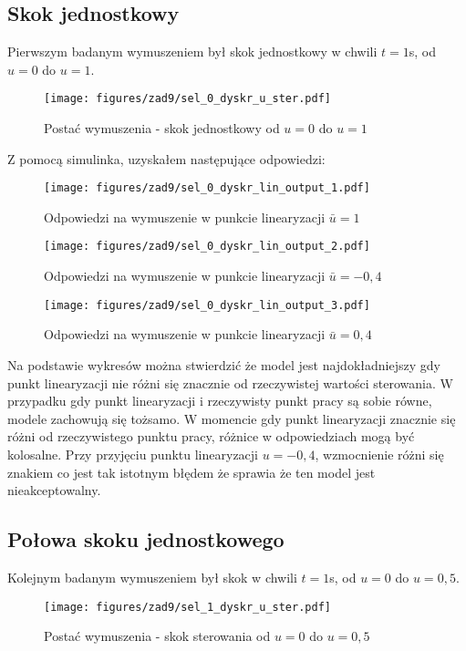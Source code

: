 \documentclass[a4paper,titlepage,11pt,floatssmall]{mwrep}
\begin{document}
\subsection{Skok jednostkowy}
Pierwszym badanym wymuszeniem był skok jednostkowy w chwili $t = 1$s, od $u = 0$ do $u = 1$.
\\ \bigskip
\begin{figure}[H]
\centering
\texttt{[image: figures/zad9/sel\_0\_dyskr\_u\_ster.pdf]}
\caption{Postać wymuszenia - skok jednostkowy od $u = 0$ do $u = 1$}
\end{figure}
\newpage
Z pomocą simulinka, uzyskałem następujące odpowiedzi:

\begin{figure}[H]
\centering
\texttt{[image: figures/zad9/sel\_0\_dyskr\_lin\_output\_1.pdf]}
\caption{Odpowiedzi na wymuszenie w punkcie linearyzacji $\bar{u} = 1$}
\end{figure}

\begin{figure}[H]
\centering
\texttt{[image: figures/zad9/sel\_0\_dyskr\_lin\_output\_2.pdf]}
\caption{Odpowiedzi na wymuszenie w punkcie linearyzacji $\bar{u} = -0,4$}
\end{figure}

\begin{figure}[H]
\centering
\texttt{[image: figures/zad9/sel\_0\_dyskr\_lin\_output\_3.pdf]}
\caption{Odpowiedzi na wymuszenie w punkcie linearyzacji $\bar{u} = 0,4$}
\end{figure}

Na podstawie wykresów można stwierdzić że model jest najdokładniejszy gdy punkt linearyzacji nie różni się znacznie od rzeczywistej wartości sterowania. W przypadku gdy punkt linearyzacji i rzeczywisty punkt pracy są sobie równe, modele zachowują się tożsamo. W momencie gdy punkt linearyzacji znacznie się różni od rzeczywistego punktu pracy, różnice w odpowiedziach mogą być kolosalne. Przy przyjęciu punktu linearyzacji $u = -0,4$, wzmocnienie różni się znakiem co jest tak istotnym błędem że sprawia że ten model jest nieakceptowalny. 
\newpage

\subsection{Połowa skoku jednostkowego}
Kolejnym badanym wymuszeniem był skok w chwili $t = 1$s, od $u = 0$ do $u = 0,5$.
\\ \bigskip
\begin{figure}[H]
\centering
\texttt{[image: figures/zad9/sel\_1\_dyskr\_u\_ster.pdf]}
\caption{Postać wymuszenia - skok sterowania od $u = 0$ do $u = 0,5$}
\end{figure}
\end{document}
